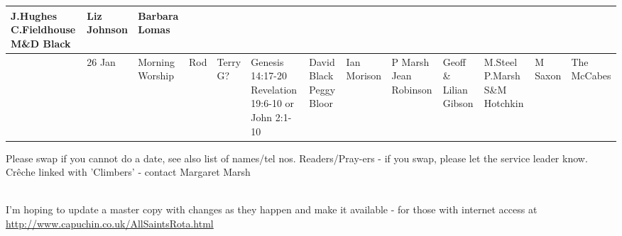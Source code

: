 \documentclass[10pt,a4paper]{article}
\begin{document}
\begin{landscape}
\begin{center}
{\begin{tabular}{|l|p{2cm}|p{1.6cm}|p{0.8cm}|p{0.8cm}|p{3.4cm}|p{2cm}|p{1.2cm}|p{2cm}|p{2cm}|p{1.9cm}
|p{2cm}|p{1.5cm}|}
J.Hughes \linebreak C.Fieldhouse \linebreak M\&D Black
&  Liz Johnson & Barbara Lomas \\
\hline
& 26 Jan & Morning Worship
& Rod & Terry G? & Genesis 14:17-20  \linebreak
Revelation 19:6-10  \linebreak
or John 2:1-10
    & David Black Peggy Bloor & Ian Morison
 &  P Marsh Jean Robinson & 
Geoff \& Lilian Gibson&
M.Steel P.Marsh \linebreak S\&M Hotchkin
&  M Saxon & The McCabes \\
\hline
\end{tabular}
}
\end{center}
\vspace{1em}
Please swap if you cannot do a date, see also list of names/tel nos.
Readers/Pray-ers - if you swap, please let the service leader know.\\
Cr\^{e}che linked with 'Climbers' - contact Margaret Marsh
{\\ \footnotesize I'm hoping to update a master copy with changes as they
happen and make it available - for those with internet access at
\url{http://www.capuchin.co.uk/AllSaintsRota.html} 


}
\end{landscape}
\end{document}
